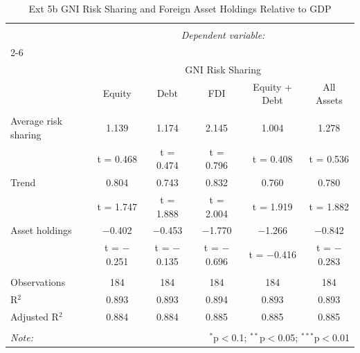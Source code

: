 
\begin{table}[!htbp] \centering 
  \caption{Ext 5b GNI Risk Sharing and Foreign Asset Holdings Relative to GDP} 
  \label{} 
\begin{tabular}{@{\extracolsep{5pt}}lccccc} 
\\[-1.8ex]\hline 
\hline \\[-1.8ex] 
 & \multicolumn{5}{c}{\textit{Dependent variable:}} \\ 
\cline{2-6} 
\\[-1.8ex] & \multicolumn{5}{c}{GNI Risk Sharing} \\ 
 & Equity & Debt & FDI & Equity + Debt & All Assets \\ 
\hline \\[-1.8ex] 
 Average risk sharing & 1.139 & 1.174 & 2.145 & 1.004 & 1.278 \\ 
  & t = 0.468 & t = 0.474 & t = 0.796 & t = 0.408 & t = 0.536 \\ 
  Trend & 0.804 & 0.743 & 0.832 & 0.760 & 0.780 \\ 
  & t = 1.747 & t = 1.888 & t = 2.004 & t = 1.919 & t = 1.882 \\ 
  Asset holdings & $-$0.402 & $-$0.453 & $-$1.770 & $-$1.266 & $-$0.842 \\ 
  & t = $-$0.251 & t = $-$0.135 & t = $-$0.696 & t = $-$0.416 & t = $-$0.283 \\ 
 \hline \\[-1.8ex] 
Observations & 184 & 184 & 184 & 184 & 184 \\ 
R$^{2}$ & 0.893 & 0.893 & 0.894 & 0.893 & 0.893 \\ 
Adjusted R$^{2}$ & 0.884 & 0.884 & 0.885 & 0.885 & 0.885 \\ 
\hline 
\hline \\[-1.8ex] 
\textit{Note:}  & \multicolumn{5}{r}{$^{*}$p$<$0.1; $^{**}$p$<$0.05; $^{***}$p$<$0.01} \\ 
\end{tabular} 
\end{table} 
